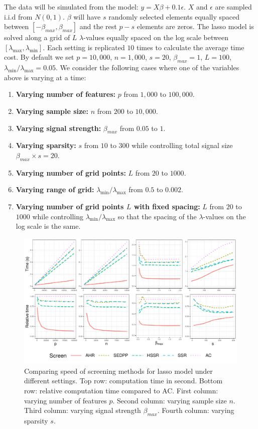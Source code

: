 The data will be simulated from the model: $y=X\beta+0.1\epsilon$. $X$ and $\epsilon$ are sampled i.i.d from $N(0,1)$. $\beta$ will have $s$ randomly selected elements equally spaced between $[-\beta_{max},\beta_{max}]$ and the rest $p-s$ elements are zeros. The lasso model is solved along a grid of $L$ $\lambda$-values equally spaced on the log scale between $[\lambda_{\max},\lambda_{\min}]$. Each setting is replicated $10$ times to calculate the average time cost. By default we set $p=10,000$, $n=1,000$, $s=20$, $\beta_{max}=1$, $L=100$, $\lambda_{\min}/\lambda_{\max}=0.05$. We consider the following cases where one of the variables above is varying at a time:

\begin{enumerate}
    \item \textbf{Varying number of features:} $p$ from $1,000$ to $100,000$.
    \item \textbf{Varying sample size:} $n$ from $200$ to $10,000$.
    \item \textbf{Varying signal strength:} $\beta_{max}$ from $0.05$ to $1$.
    \item \textbf{Varying sparsity:} $s$ from $10$ to $300$ while controlling total signal size $\beta_{max}\times s=20$.
    \item \textbf{Varying number of grid points:}  $L$ from $20$ to $1000$.
    \item \textbf{Varying range of grid:}  $\lambda_{\min}/\lambda_{\max}$ from $0.5$ to $0.002$.
    \item \textbf{Varying number of grid points $L$ with fixed spacing:} $L$ from $20$ to $1000$ while controlling $\lambda_{\min}/\lambda_{\max}$ so that the spacing of the $\lambda$-values on the log scale is the same.
\end{enumerate}

\begin{figure}[h]
    \centering
    \includegraphics[scale = 0.59]{plots/511.pdf}    \caption{Comparing speed of screening methods for lasso model under different settings. Top row: computation time in second. Bottom row: relative computation time compared to AC. First column: varying number of features $p$. Second column: varying sample size $n$. Third column: varying signal strength $\beta_{max}$. Fourth column: varying sparsity $s$.}
    \label{fig:5.1.1a}
\end{figure}

